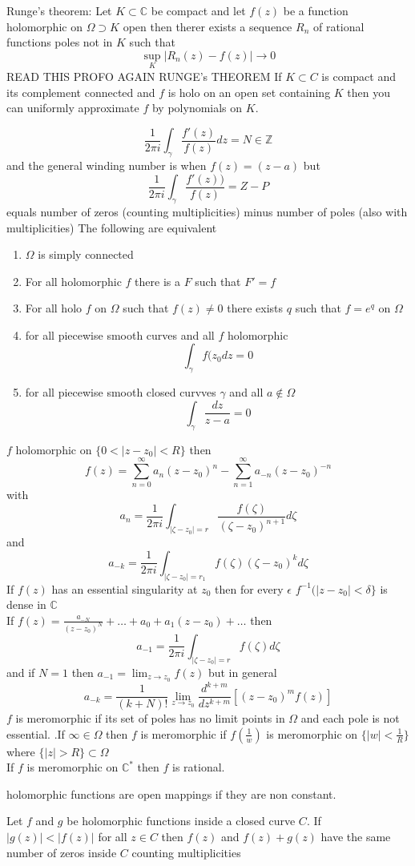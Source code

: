 \documentclass[11pt]{article}
\begin{document}
Runge's theorem: Let $K \subset \mathbb{C}$ be compact and let $f(z)$ be a function holomorphic on  $\Omega \supset K$ open
then therer exists a sequence  $R_n$ of rational functions poles not in  $K$ such that
\[
\sup_K | R_n(z) - f(z)| \to 0
\] 
READ THIS PROFO AGAIN RUNGE's THEOREM
If $K \subset C$ is compact and its complement connected and $f$ is holo on an open set containing  $K$ then you can uniformly approximate $f$ by polynomials on $K$.

\[
\frac{1}{2\pi i} \int_{ \gamma}^{} \frac{f'(z)}{f(z)}dz = N \in \mathbb{Z}
\] 
and the general winding number is when $f(z) = (z-a)$ but
\[
\frac{1}{2\pi i} \int_{\gamma}^{} \frac{f'(z))}{f(z)} = Z - P
\] 
equals number of zeros (counting multiplicities) minus number of poles (also with multiplicities)
The following are equivalent
\begin{enumerate}
    \item $\Omega$ is simply connected
    \item For all holomorphic  $f$ there is a $F$ such that  $F' = f$
    \item For all holo  $f$ on  $\Omega$ such that  $f(z) \ne 0$ there exists  $q$ such that  $f = e^{q}$ on $\Omega$
    \item for all piecewise smooth curves and all  $f$ holomorphic  
         \[
        \int_{ \gamma}^{}f(z_0dz = 0
        \] 
    \item for all piecewise smooth closed curvves $\gamma$ and all $a \not\in \Omega$ 
        \[
        \int_{\gamma}^{} \frac{dz}{z-a} =0
        \] 
\end{enumerate}

$f$ holomorphic on $\{0 < |z-z_0| < R\}$ then
\[
    f(z) = \sum_{n=0}^{\infty}a_n(z-z_0)^{n} - \sum_{n=1}^{\infty}a_{-n}(z-z_0)^{-n}
\] 
with
\[
a_n = \frac{1}{2\pi i} \int_{|\zeta - z_0| = r}^{}\frac{f(\zeta)}{(\zeta - z_0)^{n+1}} d\zeta
\] 
and
\[
    a_{-k} = \frac{1}{2\pi i } \int_{|\zeta - z_0| = r_1}^{} f(\zeta) (\zeta - z_0)^{k} d\zeta
\] 
If $f(z)$ has an essential singularity at  $z_0$ then for every $\epsilon$ $f^{-1}(|z-z_0| < \delta\}$ is dense in $ \mathbb{C}$
\\
If $f(z) = \frac{a_{-N}}{(z-z_0)^{N}} + \dots + a_0 + a_1(z-z_0) + \dots$ then
\[
    a_{-1} = \frac{1}{2\pi i} \int_{ |\zeta - z_0| = r}^{}f(\zeta) d\zeta
\] 
and if $N = 1$ then  $a_{-1} = \lim_{z\to z_0}f(z)$ but in general
\[
    a_{-k} = \frac{1}{(k+N)!}\lim_{z\to z_0} \frac{d^{k+m}}{dz^{k+m}}[(z-z_0)^{m}f(z)]
\] 
$f$ is meromorphic if its set of poles has no limit points in  $\Omega$ and each pole is not essential.
.If $\infty \in \Omega$ then $f$ is meromorphic if $f(\frac{1}{w})$ is meromorphic on $\{|w| < \frac{1}{R}\}$ where $\{|z| > R\} \subset \Omega$\\
If $f$ is meromorphic on $ \mathbb{C}^{*}$ then $f$ is rational.

holomorphic functions are open mappings if they are non constant.

Let $f$ and $g$ be holomorphic functions inside a closed curve $C$. If $|g(z)| < |f(z)|$ for all $z \in C$ then  $f(z)$ and  $f(z) + g(z)$ have the 
same number of zeros inside  $C$ counting multiplicities
\end{document}
